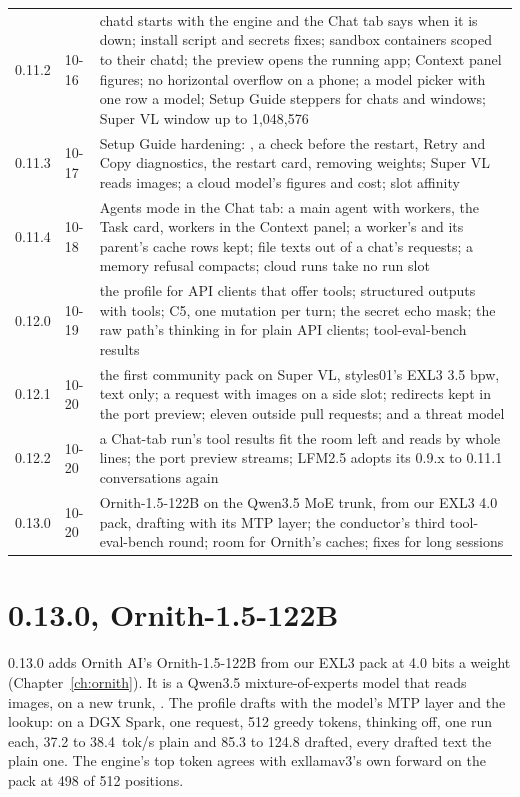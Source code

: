 \begin{table}[htbp]
\begin{tabularx}{\linewidth}{@{}L{.2\linewidth}L{.15\linewidth}Y@{}}
0.11.2 & 10-16 & chatd starts with the engine and the Chat tab says when it is down; install script and secrets fixes; sandbox containers scoped to their chatd; the preview opens the running app; Context panel figures; no horizontal overflow on a phone; a model picker with one row a model; Setup Guide steppers for chats and windows; Super VL window up to 1,048,576 \\
0.11.3 & 10-17 & Setup Guide hardening: , a check before the restart, Retry and Copy diagnostics, the restart card, removing weights; Super VL reads images; a cloud model's figures and cost; slot affinity \\
0.11.4 & 10-18 & Agents mode in the Chat tab: a main agent with workers, the Task card, workers in the Context panel; a worker's and its parent's cache rows kept; file texts out of a chat's requests; a memory refusal compacts; cloud runs take no run slot \\
0.12.0 & 10-19 & the  profile for API clients that offer tools; structured outputs with tools; C5, one mutation per turn; the secret echo mask; the raw path's thinking in  for plain API clients; tool-eval-bench results \\
0.12.1 & 10-20 & the first community pack on Super VL, styles01's EXL3 3.5 bpw, text only; a request with images on a side slot; redirects kept in the port preview; eleven outside pull requests;  and a threat model \\
0.12.2 & 10-20 & a Chat-tab run's tool results fit the room left and  reads by whole lines; the port preview streams; LFM2.5 adopts its 0.9.x to 0.11.1 conversations again \\
0.13.0 & 10-20 & Ornith-1.5-122B on the Qwen3.5 MoE trunk, from our EXL3 4.0 pack, drafting with its MTP layer; the conductor's third tool-eval-bench round; room for Ornith's caches;  fixes for long sessions \\
\bottomrule
\end{tabularx}
\end{table}

\section{0.13.0, Ornith-1.5-122B}\label{sec:changelog-0130}

0.13.0 adds Ornith AI's Ornith-1.5-122B from our EXL3 pack at 4.0 bits a weight (Chapter~\ref{ch:ornith}). It is a Qwen3.5 mixture-of-experts model that reads images, on a new trunk, . The profile drafts with the model's MTP layer and the lookup: on a DGX Spark, one request, 512 greedy tokens, thinking off, one run each, 37.2 to 38.4~tok/s plain and 85.3 to 124.8 drafted, every drafted text the plain one. The engine's top token agrees with exllamav3's own forward on the pack at 498 of 512 positions.

